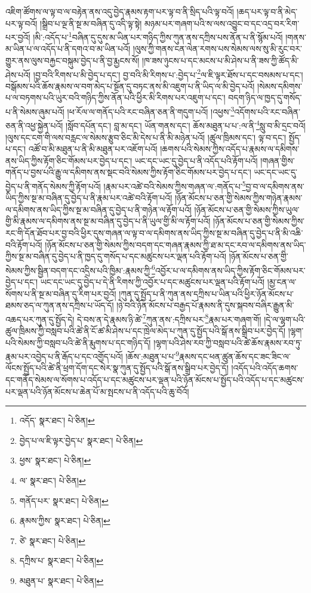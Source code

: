 འཇིག་ཚོགས་ལ་ལྟ་བ་ལ་བརྟེན་ནས་འདུ་བྱེད་རྣམས་རྟག་པར་ལྟ་བ་ནི་སྲིད་པའི་ལྟ་བའོ། །ཆད་པར་ལྟ་བ་ནི་མེད་པར་ལྟ་བའོ། །སྒྲིབ་པ་ལྔ་ནི་སྔ་མ་བཞིན་དུ་འདི་ལྟ་སྟེ། མཉམ་པར་གཞག་པའི་ས་ལས་འབྱུང་བ་དང་འདྲ་བར་རིག་པར་བྱའོ། །མི་:འདོད་པ་\footnote{འདོད་  སྣར་ཐང་།  པེ་ཅིན། }བཞིན་དུ་དུས་མ་ཡིན་པར་གཉིད་ཀྱིས་ཀུན་ནས་དཀྲིས་པས་ནོན་པ་ནི་སྙོམ་པའོ། །གནས་མ་ཡིན་པ་ལ་འདོད་པ་ནི་དགའ་བ་མ་ཡིན་པའོ། །ལུས་ཀྱི་གནས་ངན་ལེན་རགས་པས་སེམས་ལས་སུ་མི་རུང་བར་གྱུར་ནས་ལུས་བརྐྱང་བསྐུམ་བྱེད་པ་ནི་བྱ་རྨྱངས་སོ། །ཁ་ཟས་ཉུངས་པ་དང་མངས་པ་མི་ཤེས་པ་ནི་ཟས་ཀྱི་ཚོད་མི་ཤེས་པའོ། །བྱ་བའི་རིགས་པ་མི་བྱེད་པ་དང་། བྱ་བའི་མི་རིགས་པ་:བྱེད་པ་\footnote{བྱེད་པ་ལ་ཇི་ལྟར་བྱེད་པ་  སྣར་ཐང་།  པེ་ཅིན། }ལ་ཇི་ལྟར་ཐོས་པ་དང་བསམས་པ་དང་། བསྒོམས་པའི་ཆོས་རྣམས་ལ་བག་མེད་པ་སྔོན་དུ་བཏང་ནས་མི་འཇུག་པ་ནི་ཡིད་ལ་མི་བྱེད་པའོ། །སེམས་དམིགས་པ་ལ་བཏགས་པའི་ཡུར་བའི་གཉིད་ཀྱིས་ནོན་པའི་ཕྱིར་མི་རིགས་པར་འཇུག་པ་དང་། བདག་ཉིད་ལ་ཁྱད་དུ་གསོད་པ་ནི་སེམས་ཞུམ་པའོ། །ཕ་རོལ་ལ་གནོད་པའི་རང་བཞིན་ཅན་ནི་གདུག་པའོ། །འཕྱས་\footnote{ཕྱས་  སྣར་ཐང་།  པེ་ཅིན། }འདོགས་པའི་རང་བཞིན་ཅན་ནི་འཕྱ་སྐྱེན་པའོ། །སློབ་དཔོན་དང་། བླ་མ་དང་། ཡོན་གནས་དང་། ཆོས་མཐུན་པ་པ་:ལ་ནི་\footnote{ལ་  སྣར་ཐང་།  པེ་ཅིན། }སླུ་བ་མི་དྲང་བའོ། །ལུས་དང་ངག་གི་ལས་བརླང་ལ་སེམས་རྩུབ་ཅིང་མི་དེས་པ་ནི་མི་མཉེན་པའོ། །ཚུལ་ཁྲིམས་དང་། ལྟ་བ་དང་། སྤྱོད་པ་དང་། འཚོ་བ་མི་མཐུན་པ་ནི་མི་མཐུན་པར་འཇོག་པའོ། །ཆགས་པའི་སེམས་ཀྱིས་འདོད་པ་རྣམས་ལ་དམིགས་ནས་ཡིད་ཀྱིས་རྟོག་ཅིང་གོམས་པར་བྱེད་པ་དང་། ཡང་དང་ཡང་དུ་བྱེད་པ་ནི་འདོད་པའི་རྟོག་པའོ། །གཞན་གྱིས་གནོད་པ་བྱས་པའི་རྒྱུ་ལ་དམིགས་ནས་སྡང་བའི་སེམས་ཀྱིས་རྟོག་ཅིང་གོམས་པར་བྱེད་པ་དང་། ཡང་དང་ཡང་དུ་བྱེད་པ་ནི་གནོད་སེམས་ཀྱི་རྟོག་པའོ། །རྣམ་པར་འཚེ་བའི་སེམས་ཀྱིས་གཞན་ལ་:གནོད་པ་\footnote{གནོད་པར་  སྣར་ཐང་།  པེ་ཅིན། }བྱ་བ་ལ་དམིགས་ནས་ཡིད་ཀྱིས་སྔ་མ་བཞིན་དུ་བྱེད་པ་ནི་རྣམ་པར་འཚེ་བའི་རྟོག་པའོ། །ཉོན་མོངས་པ་ཅན་གྱི་སེམས་ཀྱིས་གཉེན་རྣམས་ལ་དམིགས་ནས་ཡིད་ཀྱིས་སྔ་མ་བཞིན་དུ་བྱེད་པ་ནི་གཉེན་ལ་རྟོག་པའོ། །ཉོན་མོངས་པ་ཅན་གྱི་སེམས་ཀྱིས་ཡུལ་གྱི་མི་རྣམས་ལ་དམིགས་ནས་སྔ་མ་བཞིན་དུ་བྱེད་པ་ནི་ཡུལ་གྱི་མི་ལ་རྟོག་པའོ། །ཉོན་མོངས་པ་ཅན་གྱི་སེམས་ཀྱིས་རང་གི་དོན་ཐོབ་པར་བྱ་བའི་ཕྱིར་དུས་གཞན་ལ་ལྟ་བ་ལ་དམིགས་ནས་ཡིད་ཀྱིས་སྔ་མ་བཞིན་དུ་བྱེད་པ་ནི་མི་འཆི་བའི་རྟོག་པའོ། །ཉོན་མོངས་པ་ཅན་གྱི་སེམས་ཀྱིས་བདག་དང་གཞན་རྣམས་ཀྱི་ཐ་མ་དང་རབ་ལ་དམིགས་ནས་ཡིད་ཀྱིས་སྔ་མ་བཞིན་དུ་བྱེད་པ་ནི་ཁྱད་དུ་གསོད་པ་དང་མཚུངས་པར་ལྡན་པའི་རྟོག་པའོ། །ཉོན་མོངས་པ་ཅན་གྱི་སེམས་ཀྱིས་སྦྱིན་བདག་དང་འདྲིས་པའི་ཁྱིམ་:རྣམས་ཀྱི་\footnote{རྣམས་ཀྱིས་  སྣར་ཐང་།  པེ་ཅིན། }འབྱོར་པ་ལ་དམིགས་ནས་ཡིད་ཀྱིས་རྟོག་ཅིང་གོམས་པར་བྱེད་པ་དང་། ཡང་དང་ཡང་དུ་བྱེད་པ་དེ་ནི་རིགས་ཀྱི་འབྱོར་པ་དང་མཚུངས་པར་ལྡན་པའི་རྟོག་པའོ། །མྱ་ངན་ལ་སོགས་པ་ནི་སྔ་མ་བཞིན་དུ་རིག་པར་བྱའོ། །ཀུན་དུ་སྤྱོད་པ་ནི་ཀུན་ནས་དཀྲིས་པ་ཡིན་པའི་ཕྱིར་ཉོན་མོངས་པ་ཐམས་ཅད་ལ་ཀུན་ནས་དཀྲིས་པ་ཡོད་དོ། །ཉེ་བའི་ཉོན་མོངས་པ་བརྒྱད་པོ་རྣམས་ནི་དུས་སྐབས་བཞིར་རྒྱུན་མི་འཆད་པར་ཀུན་དུ་སྤྱོད་དེ། དེ་བས་ན་དེ་རྣམས་ཉི་ཚེ་\footnote{ཙེ་  སྣར་ཐང་།  པེ་ཅིན། }ཀུན་ནས་:དཀྲིས་པར་\footnote{དཀྲིས་པ་  སྣར་ཐང་།  པེ་ཅིན། }རྣམ་པར་གཞག་གོ། །དེ་ལ་ལྷག་པའི་ཚུལ་ཁྲིམས་ཀྱི་བསླབ་པའི་ཚེ་ནི་ངོ་ཚ་མི་ཤེས་པ་དང་ཁྲེལ་མེད་པ་ཀུན་དུ་སྤྱོད་པའི་སྒོ་ནས་སྒྲིབ་པར་བྱེད་དོ། །ལྷག་པའི་སེམས་ཀྱི་བསླབ་པའི་ཚེ་ནི་རྨུགས་པ་དང་གཉིད་དོ། །ལྷག་པའི་ཤེས་རབ་ཀྱི་བསླབ་པའི་ཚེ་ཆོས་རྣམས་རབ་ཏུ་རྣམ་པར་འབྱེད་པ་ནི་རྒོད་པ་དང་འགྱོད་པའོ། །ཆོས་:མཐུན་པ་པ་\footnote{མཐུན་པ་  སྣར་ཐང་།  པེ་ཅིན། }རྣམས་དང་ཕན་ཚུན་ཆོས་དང་ཟང་ཟིང་ལ་ལོངས་སྤྱོད་པའི་ཚེ་ནི་ཕྲག་དོག་དང་སེར་སྣ་ཀུན་དུ་སྤྱོད་པའི་སྒོ་ནས་སྒྲིབ་པར་བྱེད་དོ། །འདོད་པའི་འདོད་ཆགས་དང་གནོད་སེམས་ལ་སོགས་པ་འདོད་པ་དང་མཚུངས་པར་ལྡན་པའི་ཉོན་མོངས་པ་སྤྱོད་པའི་འདོད་པ་དང་མཚུངས་པར་ལྡན་པའི་ཉོན་མོངས་པ་ཆེན་པོ་མ་སྤངས་པ་ནི་འདོད་པའི་ཆུ་བོའོ། 